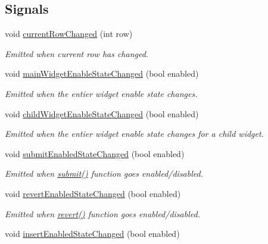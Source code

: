 \subsection*{Signals}
\begin{DoxyCompactItemize}
\item 
void \hyperlink{classmdt_abstract_sql_table_controller_a04005dbd5022ff779b56fc9334c41c3c}{current\-Row\-Changed} (int row)
\begin{DoxyCompactList}\small\item\em Emitted when current row has changed. \end{DoxyCompactList}\item 
void \hyperlink{classmdt_abstract_sql_table_controller_a8d66e50ce83d61646fbf1da25f146a91}{main\-Widget\-Enable\-State\-Changed} (bool enabled)
\begin{DoxyCompactList}\small\item\em Emitted when the entier widget enable state changes. \end{DoxyCompactList}\item 
void \hyperlink{classmdt_abstract_sql_table_controller_afe193a790eadc0912cc9a7dc4a307721}{child\-Widget\-Enable\-State\-Changed} (bool enabled)
\begin{DoxyCompactList}\small\item\em Emitted when the entier widget enable state changes for a child widget. \end{DoxyCompactList}\item 
void \hyperlink{classmdt_abstract_sql_table_controller_a3690e3c30d0fb7519915022253372376}{submit\-Enabled\-State\-Changed} (bool enabled)
\begin{DoxyCompactList}\small\item\em Emitted when \hyperlink{classmdt_abstract_sql_table_controller_a14f3e2a91fc30ca0e018944f4f95bc33}{submit()} function goes enabled/disabled. \end{DoxyCompactList}\item 
void \hyperlink{classmdt_abstract_sql_table_controller_af735dd48338c652562977f98c65dc345}{revert\-Enabled\-State\-Changed} (bool enabled)
\begin{DoxyCompactList}\small\item\em Emitted when \hyperlink{classmdt_abstract_sql_table_controller_a36af2665b6d742aba3bc7f6ee6b2a6c4}{revert()} function goes enabled/disabled. \end{DoxyCompactList}\item 
void \hyperlink{classmdt_abstract_sql_table_controller_af0f0bf9f3aef759a1babb2dd5b91950e}{insert\-Enabled\-State\-Changed} (bool enabled)

\end{DoxyCompactItemize}

